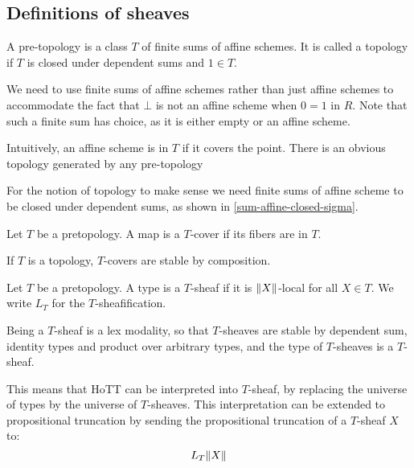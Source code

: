 \subsection{Definitions of sheaves}

\begin{definition}
A pre-topology is a class $T$ of finite sums of affine schemes. It is called a topology if $T$ is closed under dependent sums and $1\in T$.
\end{definition}

\begin{remark}
We need to use finite sums of affine schemes rather than just affine schemes to accommodate the fact that $\bot$ is not an affine scheme when $0=1$ in $R$. Note that such a finite sum has choice, as it is either empty or an affine scheme.
\end{remark}

Intuitively, an affine scheme is in $T$ if it covers the point. There is an obvious topology generated by any pre-topology

\begin{remark}
For the notion of topology to make sense we need finite sums of affine scheme to be closed under dependent sums, as shown in \cref{sum-affine-closed-sigma}.
\end{remark}

\begin{definition}
Let $T$ be a pretopology. A map is a $T$-cover if its fibers are in $T$.
\end{definition} 

If $T$ is a topology, $T$-covers are stable by composition.

\begin{definition}
Let $T$ be a pretopology. A type is a $T$-sheaf if it is $\lVert X \rVert$-local for all $X\in T$. We write $L_T$ for the $T$-sheafification.
\end{definition}

\begin{remark}
Being a $T$-sheaf is a lex modality, so that $T$-sheaves are stable by dependent sum, identity types and product over arbitrary types, and the type of $T$-sheaves is a $T$-sheaf. 
\end{remark}

This means that HoTT can be interpreted into $T$-sheaf, by replacing the universe of types by the universe of $T$-sheaves. This interpretation can be extended to propositional truncation by sending the propositional truncation of a $T$-sheaf $X$ to:
\[L_T\lVert X \rVert\]


